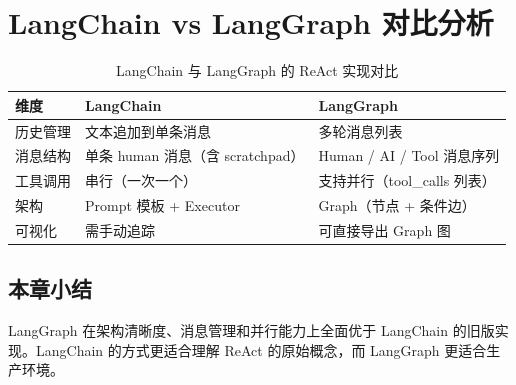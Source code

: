 \section{LangChain vs LangGraph 对比分析}

\begin{table}[H]
\centering
\begin{tabular}{lll}
\toprule
\textbf{维度} & \textbf{LangChain} & \textbf{LangGraph} \\
\midrule
历史管理 & 文本追加到单条消息 & 多轮消息列表 \\
消息结构 & 单条 human 消息（含 scratchpad） & Human / AI / Tool 消息序列 \\
工具调用 & 串行（一次一个） & 支持并行（tool\_calls 列表） \\
架构 & Prompt 模板 + Executor & Graph（节点 + 条件边） \\
可视化 & 需手动追踪 & 可直接导出 Graph 图 \\
\bottomrule
\end{tabular}
\caption{LangChain 与 LangGraph 的 ReAct 实现对比}
\end{table}

\subsection{本章小结}
LangGraph 在架构清晰度、消息管理和并行能力上全面优于 LangChain 的旧版实现。LangChain 的方式更适合理解 ReAct 的原始概念，而 LangGraph 更适合生产环境。


